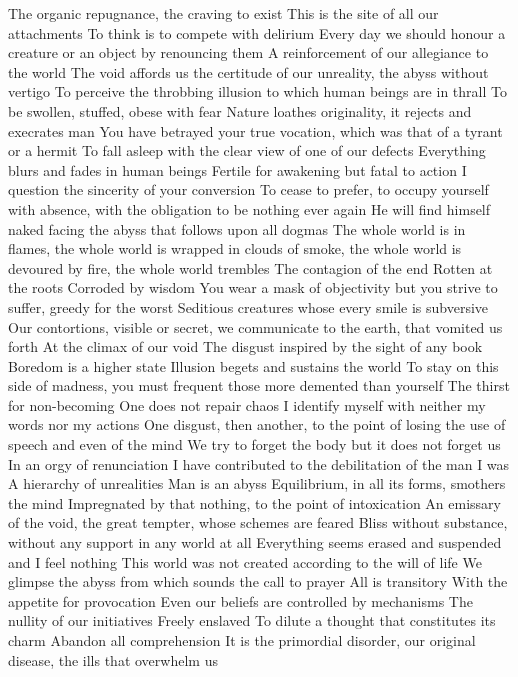 \documentclass{article}
\begin{document}
The organic repugnance, the craving to exist
This is the site of all our attachments
To think is to compete with delirium
Every day we should honour a creature or an object by renouncing them
A reinforcement of our allegiance to the world
The void affords us the certitude of our unreality, the abyss without vertigo
To perceive the throbbing illusion to which human beings are in thrall
To be swollen, stuffed, obese with fear
Nature loathes originality, it rejects and execrates man
You have betrayed your true vocation, which was that of a tyrant or a hermit
To fall asleep with the clear view of one of our defects
Everything blurs and fades in human beings
Fertile for awakening but fatal to action
I question the sincerity of your conversion
To cease to prefer, to occupy yourself with absence, with the obligation to be nothing ever again
He will find himself naked facing the abyss that follows upon all dogmas
The whole world is in flames, the whole world is wrapped in clouds of smoke, the whole world is devoured by fire, the whole world trembles
The contagion of the end
Rotten at the roots
Corroded by wisdom
You wear a mask of objectivity but you strive to suffer, greedy for the worst
Seditious creatures whose every smile is subversive
Our contortions, visible or secret, we communicate to the earth, that vomited us forth
At the climax of our void
The disgust inspired by the sight of any book
Boredom is a higher state
Illusion begets and sustains the world
To stay on this side of madness, you must frequent those more demented than yourself
The thirst for non-becoming
One does not repair chaos
I identify myself with neither my words nor my actions
One disgust, then another, to the point of losing the use of speech and even of the mind
We try to forget the body but it does not forget us
In an orgy of renunciation
I have contributed to the debilitation of the man I was
A hierarchy of unrealities
Man is an abyss
Equilibrium, in all its forms, smothers the mind
Impregnated by that nothing, to the point of intoxication
An emissary of the void, the great tempter, whose schemes are feared
Bliss without substance, without any support in any world at all
Everything seems erased and suspended and I feel nothing
This world was not created according to the will of life
We glimpse the abyss from which sounds the call to prayer
All is transitory
With the appetite for provocation
Even our beliefs are controlled by mechanisms
The nullity of our initiatives
Freely enslaved
To dilute a thought that constitutes its charm
Abandon all comprehension
It is the primordial disorder, our original disease, the ills that overwhelm us
\end{document}
